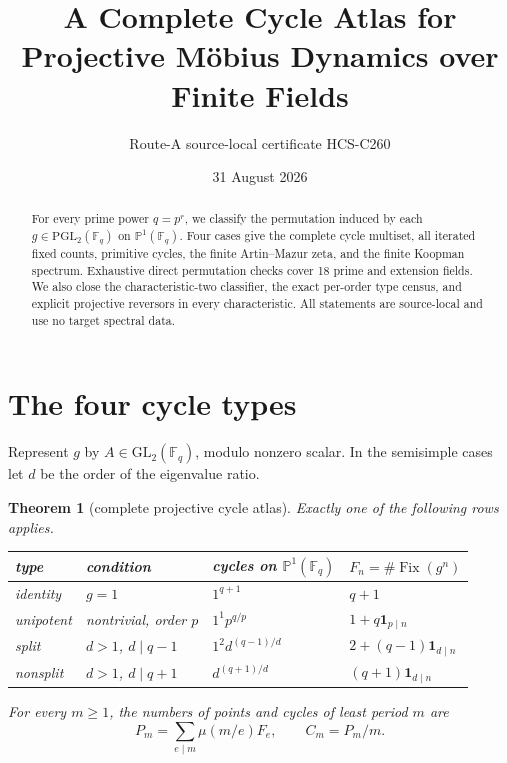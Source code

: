 \documentclass[10pt]{article}
\title{A Complete Cycle Atlas for Projective M\"obius Dynamics over Finite Fields}
\author{Route-A source-local certificate HCS-C260}
\date{31 August 2026}
\newtheorem{theorem}{Theorem}
\newcommand{\F}{\mathbb F}
\newcommand{\Fix}{\operatorname{Fix}}
\begin{document}
\maketitle
\begin{abstract}
For every prime power $q=p^r$, we classify the permutation induced by each
$g\in\mathrm{PGL}_2(\F_q)$ on $\mathbb P^1(\F_q)$.  Four cases give the
complete cycle multiset, all iterated fixed counts, primitive cycles, the
finite Artin--Mazur zeta, and the finite Koopman spectrum.  Exhaustive direct
permutation checks cover 18 prime and extension fields.  We also close the
characteristic-two classifier, the exact per-order type census, and explicit
projective reversors in every characteristic.  All statements are
source-local and use no target spectral data.
\end{abstract}

\section{The four cycle types}
Represent $g$ by $A\in\mathrm{GL}_2(\F_q)$, modulo nonzero scalar.  In the
semisimple cases let $d$ be the order of the eigenvalue ratio.
\begin{theorem}[complete projective cycle atlas]\label{thm:atlas}
Exactly one of the following rows applies.
\begin{center}\small
\begin{tabular}{@{}p{.20\linewidth}p{.25\linewidth}p{.24\linewidth}p{.23\linewidth}@{}}
\toprule
type & condition & cycles on $\mathbb P^1(\F_q)$ & $F_n=\#\Fix(g^n)$\\
\midrule
identity & $g=1$ & $1^{q+1}$ & $q+1$\\
unipotent & nontrivial, order $p$ & $1^1p^{q/p}$ & $1+q\mathbf1_{p\mid n}$\\
split & $d>1$, $d\mid q-1$ & $1^2d^{(q-1)/d}$ & $2+(q-1)\mathbf1_{d\mid n}$\\
nonsplit & $d>1$, $d\mid q+1$ & $d^{(q+1)/d}$ & $(q+1)\mathbf1_{d\mid n}$\\
\bottomrule
\end{tabular}
\end{center}
For every $m\ge1$, the numbers of points and cycles of least period $m$ are
\[
 P_m=\sum_{e\mid m}\mu(m/e)F_e,\qquad C_m=P_m/m.       \tag{1}
\]
\end{theorem}
\end{document}
